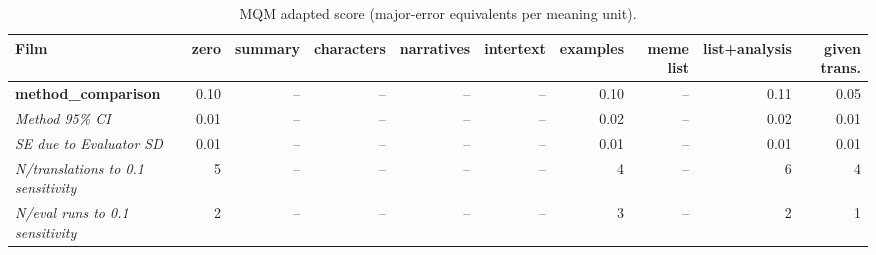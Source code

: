 \begin{table}[ht]
\centering
\begin{adjustbox}{width=\textwidth}
\begin{tabular}{lrrrrrrrr|r}
Film & zero & summary & characters & narratives & intertext & examples & meme list & list+analysis & given trans. \\
\hline
\textbf{method\_comparison} & 0.10 & -- & -- & -- & -- & 0.10 & -- & 0.11 & 0.05 \\

\emph{Method 95\% CI} & 0.01 & -- & -- & -- & -- & 0.02 & -- & 0.02 & 0.01 \\

\emph{SE due to Evaluator SD} & 0.01 & -- & -- & -- & -- & 0.01 & -- & 0.01 & 0.01 \\

\emph{N/translations to 0.1 sensitivity} & 5 & -- & -- & -- & -- & 4 & -- & 6 & 4 \\

\emph{N/eval runs to 0.1 sensitivity} & 2 & -- & -- & -- & -- & 3 & -- & 2 & 1 \\

\hline
\end{tabular}
\end{adjustbox}
\caption{MQM adapted score (major-error equivalents per meaning unit).}
\label{tab:mqm-method-comparison}
\end{table}
